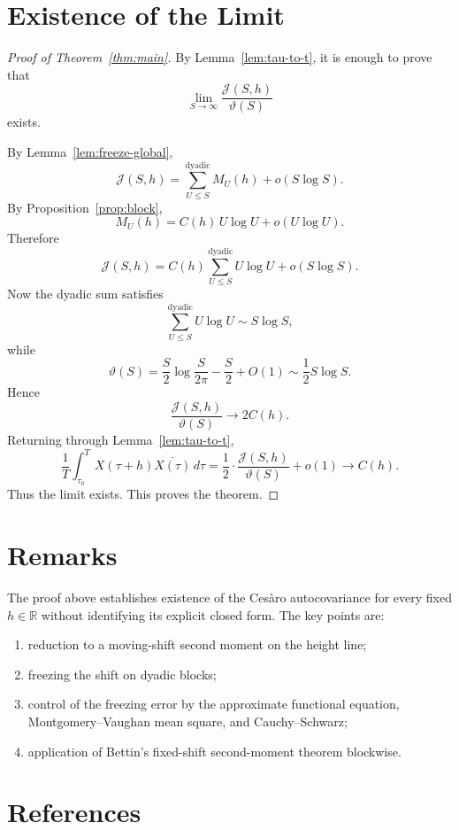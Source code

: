 \documentclass[11pt]{article}
\theoremstyle{plain}
\theoremstyle{definition}
\begin{document}
\section{Existence of the Limit}

\begin{proof}[Proof of Theorem~\ref{thm:main}]
By Lemma~\ref{lem:tau-to-t}, it is enough to prove that
\[
\lim_{S\to\infty}\frac{\mathcal J(S,h)}{\vartheta(S)}
\]
exists.

By Lemma~\ref{lem:freeze-global},
\[
\mathcal J(S,h)
=
\sum_{U\le S}^{\mathrm{dyadic}} M_U(h)+o(S\log S).
\]
By Proposition~\ref{prop:block},
\[
M_U(h)=C(h)\,U\log U+o(U\log U).
\]
Therefore
\[
\mathcal J(S,h)
=
C(h)\sum_{U\le S}^{\mathrm{dyadic}} U\log U + o(S\log S).
\]
Now the dyadic sum satisfies
\[
\sum_{U\le S}^{\mathrm{dyadic}} U\log U
\sim S\log S,
\]
while
\[
\vartheta(S)
=
\frac{S}{2}\log\frac{S}{2\pi}-\frac{S}{2}+O(1)
\sim \frac12 S\log S.
\]
Hence
\[
\frac{\mathcal J(S,h)}{\vartheta(S)} \to 2C(h).
\]
Returning through Lemma~\ref{lem:tau-to-t},
\[
\frac1T\int_{\tau_0}^T X(\tau+h)\overline{X(\tau)}\,d\tau
=
\frac12\cdot \frac{\mathcal J(S,h)}{\vartheta(S)}+o(1)
\to C(h).
\]
Thus the limit exists. This proves the theorem.
\end{proof}

\section{Remarks}

The proof above establishes existence of the Ces\`aro autocovariance for every fixed
$h\in\mathbb{R}$ without identifying its explicit closed form. The key points are:

\begin{enumerate}
\item reduction to a moving-shift second moment on the height line;
\item freezing the shift on dyadic blocks;
\item control of the freezing error by the approximate functional equation,
Montgomery--Vaughan mean square, and Cauchy--Schwarz;
\item application of Bettin's fixed-shift second-moment theorem blockwise.
\end{enumerate}

\section{References}
\end{document}
